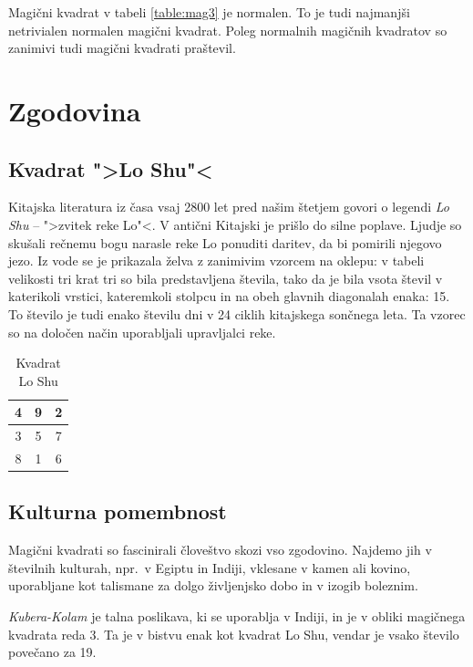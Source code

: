 \documentclass[a4paper,12pt]{article}
\theoremstyle{definition}
\theoremstyle{plain}
\newenvironment{magic}[3]{\begin{table}[!ht]
   \centering
   \caption{#2}
   \label{#3}
   \large
   \begin{tabular}{|*{#1}{c|}}
   \hline}{\end{tabular}
   \normalsize
\end{table}}
\begin{document}
Magični kvadrat v tabeli \ref{table:mag3} je normalen.
To je tudi najmanjši netrivialen normalen magični kvadrat.
Poleg normalnih magičnih kvadratov so zanimivi tudi magični kvadrati praštevil.


\section{Zgodovina}

\subsection{Kvadrat ">Lo Shu"<}

Kitajska literatura iz časa vsaj 2800 let pred našim štetjem govori o legendi
\emph{Lo Shu} -- ">zvitek reke Lo"<. V antični Kitajski je prišlo do
silne poplave. Ljudje so skušali rečnemu bogu narasle reke Lo ponuditi daritev,
da bi pomirili njegovo jezo. Iz vode se je prikazala želva z zanimivim vzorcem
na oklepu: v tabeli velikosti tri krat tri so bila predstavljena števila, tako
da je bila vsota števil v katerikoli vrstici, kateremkoli stolpcu in na obeh
glavnih diagonalah enaka: 15. To število je tudi enako številu dni v 24 ciklih
kitajskega sončnega leta. Ta vzorec so na določen način uporabljali upravljalci
reke.

\begin{magic}{3}{Kvadrat Lo Shu}{table:loshu}
4 & 9 & 2 \\\hline
3 & 5 & 7 \\\hline
8 & 1 & 6 \\\hline
\end{magic}


\subsection{Kulturna pomembnost}

Magični kvadrati so fascinirali človeštvo skozi vso zgodovino. Najdemo jih
v številnih kulturah, npr.\ v Egiptu in Indiji, vklesane v kamen ali
kovino, uporabljane kot talismane za dolgo življenjsko dobo in v
izogib boleznim.

\emph{Kubera-Kolam} je talna poslikava, ki se uporablja v Indiji, in je v
obliki magičnega kvadrata reda 3. Ta je v bistvu enak kot kvadrat
Lo Shu, vendar je vsako število povečano za 19.
\end{document}
